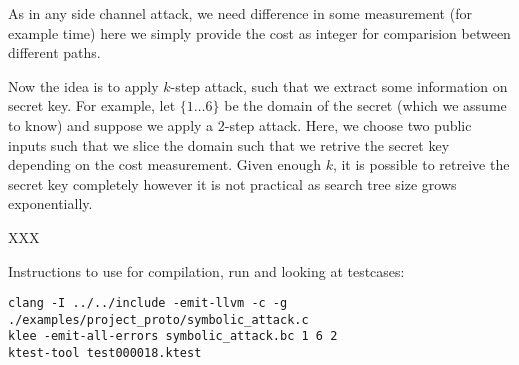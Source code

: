 \documentclass[11pt,a4paper,notitlepage]{article}
\begin{document}
As in any side channel attack, we need difference in some measurement (for example time) here we simply provide the cost as integer
for comparision between different paths.

Now the idea is to apply $k$-step attack, such that we extract some information on secret key.
For example, let $\{1 \dots 6\}$ be the domain of the secret (which we assume to know) and suppose we apply a $2$-step attack.
Here, we choose two public inputs such that we slice the domain such that we retrive the secret key depending on the cost measurement.
Given enough $k$, it is possible to retreive the secret key completely however it is not practical as search tree size grows exponentially.

XXX

Instructions to use for compilation, run and looking at testcases:
\begin{verbatim}
clang -I ../../include -emit-llvm -c -g ./examples/project_proto/symbolic_attack.c
klee -emit-all-errors symbolic_attack.bc 1 6 2
ktest-tool test000018.ktest
\end{verbatim}

\newpage




\end{document}
